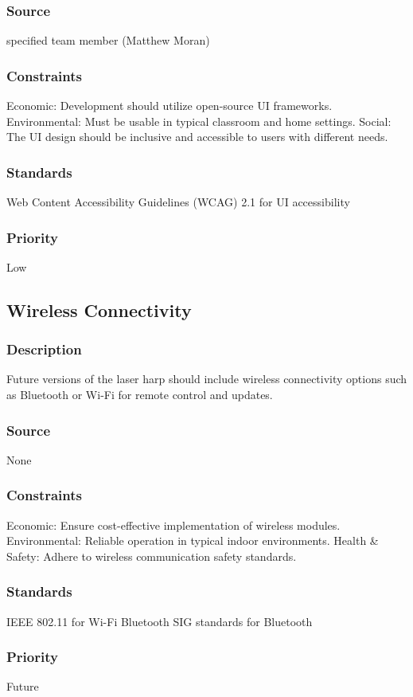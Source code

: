 \subsubsection{Source}
specified team member (Matthew Moran)
\subsubsection{Constraints}
Economic: Development should utilize open-source UI frameworks.
Environmental: Must be usable in typical classroom and home settings.
Social: The UI design should be inclusive and accessible to users with different needs.
\subsubsection{Standards}
Web Content Accessibility Guidelines (WCAG) 2.1 for UI accessibility
\subsubsection{Priority}
Low


\subsection{Wireless Connectivity}
\subsubsection{Description}
Future versions of the laser harp should include wireless connectivity options such as Bluetooth or Wi-Fi for remote control and updates.
\subsubsection{Source}
None
\subsubsection{Constraints}
Economic: Ensure cost-effective implementation of wireless modules.
Environmental: Reliable operation in typical indoor environments.
Health & Safety: Adhere to wireless communication safety standards.
\subsubsection{Standards}
IEEE 802.11 for Wi-Fi
Bluetooth SIG standards for Bluetooth
\subsubsection{Priority}
Future
